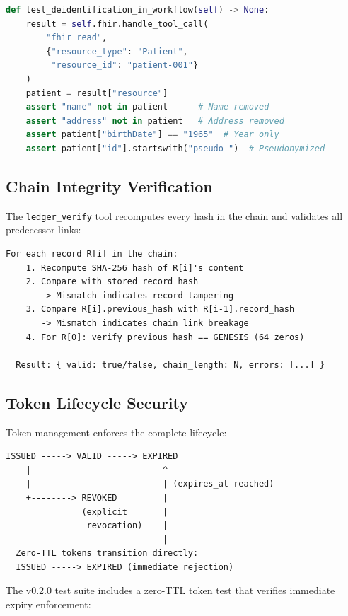 \documentclass[10pt,letterpaper]{article}
\begin{document}
\begin{lstlisting}[language=Python,title={\textbf{De-identification Verification Test}}]
def test_deidentification_in_workflow(self) -> None:
    result = self.fhir.handle_tool_call(
        "fhir_read",
        {"resource_type": "Patient",
         "resource_id": "patient-001"}
    )
    patient = result["resource"]
    assert "name" not in patient      # Name removed
    assert "address" not in patient   # Address removed
    assert patient["birthDate"] == "1965"  # Year only
    assert patient["id"].startswith("pseudo-")  # Pseudonymized
\end{lstlisting}

\subsection{Chain Integrity Verification}

The \texttt{ledger\_verify} tool recomputes every hash in the chain and validates all predecessor links:

\begin{lstlisting}[title={\textbf{Chain Verification Process}}]
  For each record R[i] in the chain:
    1. Recompute SHA-256 hash of R[i]'s content
    2. Compare with stored record_hash
       -> Mismatch indicates record tampering
    3. Compare R[i].previous_hash with R[i-1].record_hash
       -> Mismatch indicates chain link breakage
    4. For R[0]: verify previous_hash == GENESIS (64 zeros)

  Result: { valid: true/false, chain_length: N, errors: [...] }
\end{lstlisting}

\subsection{Token Lifecycle Security}

Token management enforces the complete lifecycle:

\begin{lstlisting}[title={\textbf{Token Lifecycle State Machine}}]
  ISSUED -----> VALID -----> EXPIRED
    |                          ^
    |                          | (expires_at reached)
    +--------> REVOKED         |
               (explicit       |
                revocation)    |
                               |
  Zero-TTL tokens transition directly:
  ISSUED -----> EXPIRED (immediate rejection)
\end{lstlisting}

The v0.2.0 test suite includes a zero-TTL token test that verifies immediate expiry enforcement:
\end{document}
